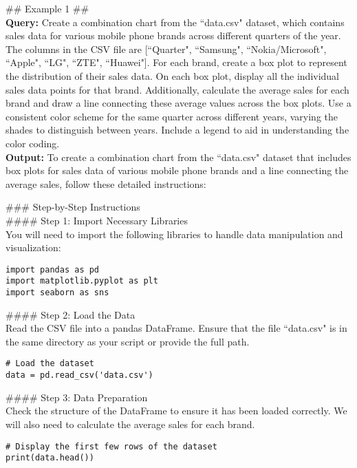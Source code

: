 \begin{mdframed}[backgroundcolor=gray!20, linewidth=1pt]
\#\# Example 1 \#\#\\

\textbf{Query:} Create a combination chart from the ``data.csv" dataset, which contains sales data for various mobile phone brands across different quarters of the year. The columns in the CSV file are [``Quarter", ``Samsung", ``Nokia/Microsoft", ``Apple", ``LG", ``ZTE", ``Huawei"]. For each brand, create a box plot to represent the distribution of their sales data. On each box plot, display all the individual sales data points for that brand. Additionally, calculate the average sales for each brand and draw a line connecting these average values across the box plots. Use a consistent color scheme for the same quarter across different years, varying the shades to distinguish between years. Include a legend to aid in understanding the color coding.\\

\textbf{Output:} To create a combination chart from the ``data.csv" dataset that includes box plots for sales data of various mobile phone brands and a line connecting the average sales, follow these detailed instructions:

\#\#\# Step-by-Step Instructions\\
\#\#\#\# Step 1: Import Necessary Libraries\\
You will need to import the following libraries to handle data manipulation and visualization:
\begin{lstlisting}[style=pythonstyle]
import pandas as pd
import matplotlib.pyplot as plt
import seaborn as sns
\end{lstlisting}

\#\#\#\# Step 2: Load the Data\\
Read the CSV file into a pandas DataFrame. Ensure that the file ``data.csv" is in the same directory as your script or provide the full path.

\begin{lstlisting}[style=pythonstyle]
# Load the dataset
data = pd.read_csv('data.csv')
\end{lstlisting}

\#\#\#\# Step 3: Data Preparation\\
Check the structure of the DataFrame to ensure it has been loaded correctly. We will also need to calculate the average sales for each brand.

\begin{lstlisting}[style=pythonstyle]
# Display the first few rows of the dataset
print(data.head())


\end{lstlisting}
\end{mdframed}
